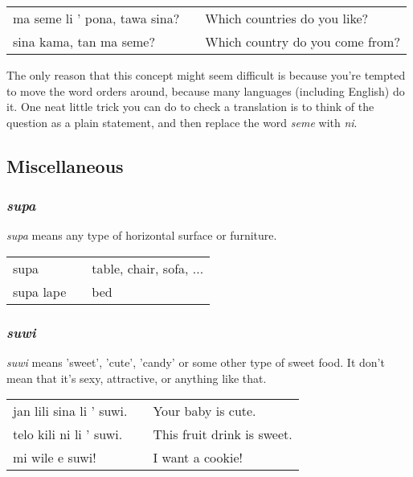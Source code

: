\begin{supertabular}{p{5,5cm}|ll}
ma seme li ' pona, tawa sina? && Which countries do you like? \\
sina kama, tan ma seme? && Which country do you come from? \\ 
\end{supertabular} 

The only reason that this concept might seem difficult is because you're tempted to move the word orders around, because many languages (including English) do it. 
One neat little trick you can do to check a translation is to think of the question as a plain statement, and then replace the word \textit{seme} with \textit{ni}. 
%
%
%
\subsection*{Miscellaneous}
%
\subsubsection*{\textit{supa}}
%
\textit{supa} means any type of horizontal surface or furniture. 

\begin{supertabular}{p{5,5cm}|ll}
supa  && table, chair, sofa, ...  \\
supa lape &&  bed \\
\end{supertabular} 

%
\subsubsection*{\textit{suwi}}
%
\textit{suwi} means 'sweet', 'cute', 'candy' or some other type of sweet food. 
It don't mean that it's sexy, attractive, or anything like that. 

\begin{supertabular}{p{5,5cm}|ll}
jan lili sina li ' suwi. && Your baby is cute. \\
telo kili ni li ' suwi. && This fruit drink is sweet. \\
mi wile e suwi! && I want a cookie! \\
\end{supertabular} 

